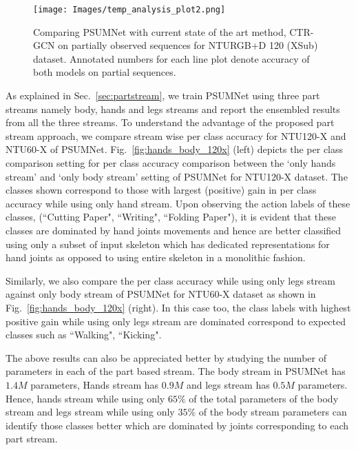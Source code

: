 \documentclass[runningheads]{llncs}
\begin{document}
\begin{figure}[!t]
  \centering
  \texttt{[image: Images/temp\_analysis\_plot2.png]}
  \caption{Comparing PSUMNet with current state of the art method, CTR-GCN on partially observed sequences for NTURGB+D 120 (XSub) dataset. Annotated numbers for each line plot denote accuracy of both models on partial sequences.} \label{fig:temp_analysis}
\end{figure}

As explained in Sec.~\ref{sec:partstream}, we train PSUMNet using three part streams namely body, hands and legs streams and report the ensembled results from all the three streams. To understand the advantage of the proposed part stream approach, we compare stream wise per class accuracy for NTU120-X and NTU60-X of PSUMNet. Fig.~\ref{fig:hands_body_120x} (left) depicts the per class comparison setting for per class accuracy comparison between the `only hands stream' and `only body stream' setting of PSUMNet for NTU120-X dataset. The classes shown correspond to those with largest (positive) gain in per class accuracy while using only hand stream. Upon observing the action labels of these classes, (``Cutting Paper", ``Writing", ``Folding Paper"), it is evident that these classes are dominated by hand joints movements and hence are better classified using only a subset of input skeleton which has dedicated representations for hand joints as opposed to using entire skeleton in a monolithic fashion. 

Similarly, we also compare the per class accuracy while using only legs stream against only body stream of PSUMNet for NTU60-X dataset as shown in Fig.~\ref{fig:hands_body_120x} (right). In this case too, the class labels with highest positive gain while using only legs stream are dominated correspond to expected classes such as ``Walking", ``Kicking". 

The above results can also be appreciated better by studying the number of parameters in each of the part based stream. The body stream in PSUMNet has $1.4M$ parameters, Hands stream has $0.9M$ and legs stream has $0.5M$ parameters. Hence, hands stream while using only $65\%$ of the total parameters of the body stream and legs stream while using only $35\%$ of the body stream parameters can identify those classes better which are dominated by joints corresponding to each part stream. 
\end{document}
